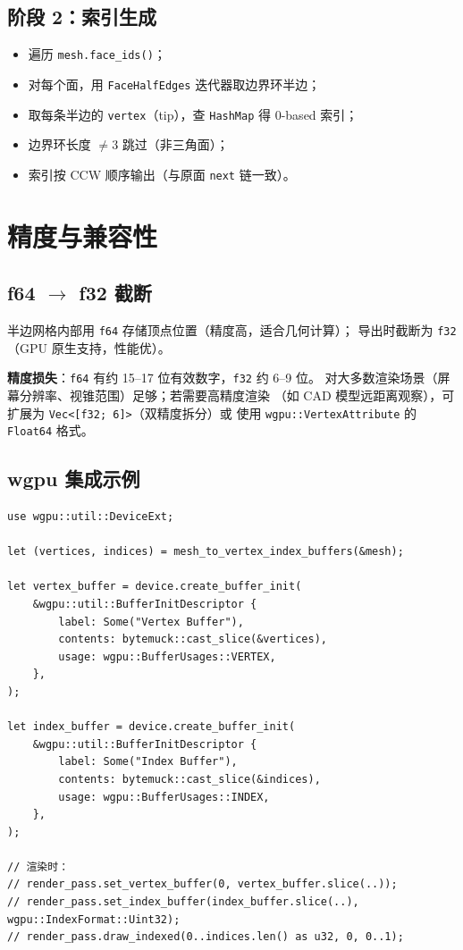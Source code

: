 \documentclass[11pt,a4paper]{article}
\begin{document}
\subsection{阶段 2：索引生成}

\begin{itemize}
  \item 遍历 \texttt{mesh.face\_ids()}；
  \item 对每个面，用 \texttt{FaceHalfEdges} 迭代器取边界环半边；
  \item 取每条半边的 \texttt{vertex}（tip），查 \texttt{HashMap} 得 0-based 索引；
  \item 边界环长度 $\ne 3$ 跳过（非三角面）；
  \item 索引按 CCW 顺序输出（与原面 \texttt{next} 链一致）。
\end{itemize}

\section{精度与兼容性}

\subsection{f64 $\to$ f32 截断}

半边网格内部用 \texttt{f64} 存储顶点位置（精度高，适合几何计算）；
导出时截断为 \texttt{f32}（GPU 原生支持，性能优）。

\textbf{精度损失}：\texttt{f64} 有约 15--17 位有效数字，\texttt{f32} 约 6--9 位。
对大多数渲染场景（屏幕分辨率、视锥范围）足够；若需要高精度渲染
（如 CAD 模型远距离观察），可扩展为 \texttt{Vec<[f32; 6]>}（双精度拆分）或
使用 \texttt{wgpu::VertexAttribute} 的 \texttt{Float64} 格式。

\subsection{wgpu 集成示例}

\begin{lstlisting}
use wgpu::util::DeviceExt;

let (vertices, indices) = mesh_to_vertex_index_buffers(&mesh);

let vertex_buffer = device.create_buffer_init(
    &wgpu::util::BufferInitDescriptor {
        label: Some("Vertex Buffer"),
        contents: bytemuck::cast_slice(&vertices),
        usage: wgpu::BufferUsages::VERTEX,
    },
);

let index_buffer = device.create_buffer_init(
    &wgpu::util::BufferInitDescriptor {
        label: Some("Index Buffer"),
        contents: bytemuck::cast_slice(&indices),
        usage: wgpu::BufferUsages::INDEX,
    },
);

// 渲染时：
// render_pass.set_vertex_buffer(0, vertex_buffer.slice(..));
// render_pass.set_index_buffer(index_buffer.slice(..), wgpu::IndexFormat::Uint32);
// render_pass.draw_indexed(0..indices.len() as u32, 0, 0..1);
\end{lstlisting}
\end{document}
